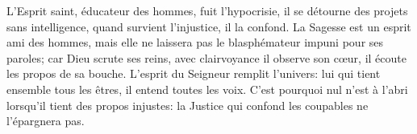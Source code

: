 L’Esprit saint, éducateur des hommes, fuit l’hypocrisie,
	il se détourne des projets sans intelligence,
	quand survient l’injustice, il la confond.
La Sagesse est un esprit ami des hommes,
	mais elle ne laissera pas le blasphémateur impuni pour ses paroles;
	car Dieu scrute ses reins, avec clairvoyance il observe son cœur,
	il écoute les propos de sa bouche.
L’esprit du Seigneur remplit l’univers:
	lui qui tient ensemble tous les êtres, il entend toutes les voix.
C’est pourquoi nul n’est à l’abri lorsqu’il tient des propos injustes:
	la Justice qui confond les coupables ne l’épargnera pas.
